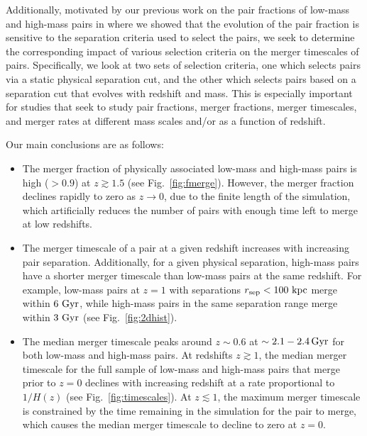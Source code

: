 \documentclass[twocolumn,linenumbers]{aastex631}
\begin{document}
    Additionally, motivated by our previous work on the pair fractions of low-mass and high-mass pairs in \citet{Chamberlain2024} where we showed that the evolution of the pair fraction is sensitive to the separation criteria used to select the pairs, we seek to determine the corresponding impact of various selection criteria on the merger timescales of pairs. 
    Specifically, we look at two sets of selection criteria, one which selects pairs via a static physical separation cut, and the other which selects pairs based on a separation cut that evolves with redshift and mass.
    This is especially important for studies that seek to study pair fractions, merger fractions, merger timescales, and merger rates at different mass scales and/or as a function of redshift. 

    Our main conclusions are as follows: 
    \begin{itemize}
        \item The merger fraction of physically associated low-mass and high-mass pairs is high ($>0.9$) at $z\gtrsim1.5$ (see Fig.~\ref{fig:fmerge}). However, the merger fraction declines rapidly to zero as $z\to0$, due to the finite length of the simulation, which artificially reduces the number of pairs with enough time left to merge at low redshifts. %
        \item The merger timescale of a pair at a given redshift increases with increasing pair separation. Additionally, for a given physical separation, high-mass pairs have a shorter merger timescale than low-mass pairs at the same redshift. For example, low-mass pairs at $z=1$ with separations $r_{\mathrm{sep}}<100\,\mathrm{\,kpc}$ merge within $6\, \mathrm{\,Gyr}$, while high-mass pairs in the same separation range merge within $3\, \mathrm{\,Gyr}$ (see Fig.~\ref{fig:2dhist}).
        \item 
        The median merger timescale peaks around $z\sim0.6$ at $\sim2.1-2.4\mathrm{\,Gyr}$ for both low-mass and high-mass pairs.
        At redshifts $z\gtrsim1$, the median merger timescale for the full sample of low-mass and high-mass pairs that merge prior to $z=0$ declines with increasing redshift at a rate proportional to $1/H(z)$ (see Fig.~\ref{fig:timescales}). 
        At $z\lesssim1$, the maximum merger timescale is constrained by the time remaining in the simulation for the pair to merge, which causes the median merger timescale to decline to zero at $z=0$. 

\end{itemize}
\end{document}
